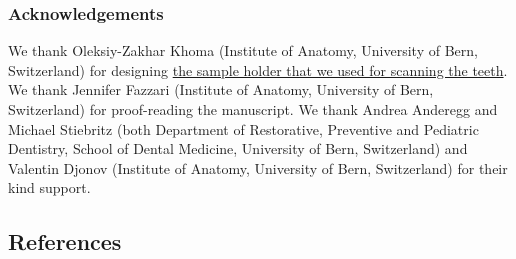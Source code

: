 \documentclass[
  american,
]{article}
\begin{document}
\hypertarget{acknowledgements}{%
\subsubsection{Acknowledgements}\label{acknowledgements}}

We thank Oleksiy-Zakhar Khoma (Institute of Anatomy, University of Bern, Switzerland) for designing \href{https://github.com/TomoGraphics/Hol3Drs/blob/master/STL/tooth_holder3.stl}{the sample holder that we used for scanning the teeth}.
We thank Jennifer Fazzari (Institute of Anatomy, University of Bern, Switzerland) for proof-reading the manuscript.
We thank Andrea Anderegg and Michael Stiebritz (both Department of Restorative, Preventive and Pediatric Dentistry, School of Dental Medicine, University of Bern, Switzerland) and Valentin Djonov (Institute of Anatomy, University of Bern, Switzerland) for their kind support.

\hypertarget{references}{%
\subsection{References}\label{references}}
\end{document}

